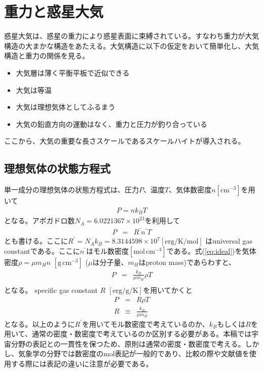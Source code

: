 \section{重力と惑星大気}
惑星大気は、惑星の重力により惑星表面に束縛されている。すなわち重力が大気構造の大まかな構造をあたえる。大気構造に以下の仮定をおいて簡単化し、大気構造と重力の関係を見る。
\begin{itemize}
    \item 大気層は薄く平衡平板で近似できる
    \item 大気は等温
    \item 大気は理想気体としてふるまう
    \item 大気の鉛直方向の運動はなく、重力と圧力が釣り合っている
\end{itemize}
ここから、大気の重要な長さスケールであるスケールハイトが導入される。

\subsection*{理想気体の状態方程式 \label{ss:idealgass}}
単一成分の理想気体の状態方程式は、圧力$P$、温度$T$、気体数密度$n [\mathrm{cm^{-3}}]$を用いて
\begin{eqnarray}
\label{eq:ideal}
P = n k_B T
\end{eqnarray}
となる。アボガドロ数$N_A=6.0221367 \times 10^{23}$を利用して
\begin{eqnarray}
\label{eq:idealRastmol}
P &=& R^\prime n^\prime T 
\end{eqnarray}
とも書ける。ここに$R^\prime = N_A k_B = 8.3144598 \times 10^7 [\mathrm{erg/K/mol}]$ はuniversal gas constantである。ここに$n^\prime$はモル数密度$[\mathrm{mol \, cm^{-3}}]$である。式(\ref{eq:ideal})を気体密度$\rho = \mu m_H n \,\,[\mathrm{g \, cm^{-3}}]$ ($\mu$は分子量、$m_H$はproton mass)であらわすと、
\begin{eqnarray}
\label{eq:idealRast}
P &=& \frac{k_B}{\mu m_H} \rho T \\
\end{eqnarray}
となる。 specific gas constant $R \,\,[\mathrm{erg/g/K}]$を用いてかくと
\begin{eqnarray}
\label{eq:idealR}
P &=& R \rho T \\
R &\equiv& \frac{k_B}{\mu m_H}
\end{eqnarray}
となる。以上のように$R^\prime$を用いてモル数密度で考えているのか、$k_B$もしくは$R$を用いて、通常の密度・数密度で考えているのか区別する必要がある。本稿では宇宙分野の表記との一貫性を保つため、原則は通常の密度・数密度で考える。しかし、気象学の分野では数密度のmol表記が一般的であり、比較の際や文献値を使用する際には表記の違いに注意が必要である。



